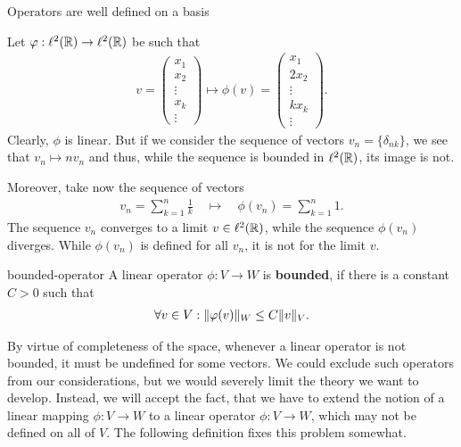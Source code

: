 \begin{todo}
  Operators are well defined on a basis
\end{todo}

\begin{example}
  Let $\varphi:\ell^2(\mathbb R)\to\ell^2(\mathbb R)$ be such that
  \begin{gather*}
    v =
    \begin{pmatrix}
      x_1 \\ x_2 \\ \vdots \\ x_k \\ \vdots
    \end{pmatrix}
    \mapsto \phi(v) =
    \begin{pmatrix}
      x_1 \\ 2x_2 \\ \vdots \\ kx_k \\ \vdots
    \end{pmatrix}.
  \end{gather*}
  Clearly, $\phi$ is linear. But if we consider the sequence of
  vectors $v_n = \{\delta_{nk}\}$, we see that $v_n \mapsto n v_n$ and
  thus, while the sequence is bounded in $\ell^2(\mathbb R)$, its image is
  not.
  
  Moreover, take now the sequence of vectors
  \begin{gather*}
    v_n = \sum_{k=1}^n \frac1k
    \quad \mapsto \quad \phi(v_n) = \sum_{k=1}^n 1.
  \end{gather*}
  The sequence $v_n$ converges to a limit $v \in \ell^2(\mathbb R)$, while
  the sequence $\phi(v_n)$ diverges. While $\phi(v_n)$ is defined for
  all $v_n$, it is not for the limit $v$.
\end{example}

\begin{Definition}{bounded-operator}
  A linear operator $\phi: V\to W$ is \textbf{bounded}, if there is a constant
  $C > 0$ such that
  \begin{gather*}
    \forall v\in V: \lVert\varphi(v)\rVert_W \le C \lVert v\vphantom{()}\rVert_V.
  \end{gather*}
\end{Definition}

\begin{remark}
  By virtue of completeness of the space, whenever a linear operator
  is not bounded, it must be undefined for some vectors. We could
  exclude such operators from our considerations, but we would
  severely limit the theory we want to develop. Instead, we will
  accept the fact, that we have to extend the notion of a linear
  mapping $\phi: V\to W$ to a linear operator $\phi: V\to W$, which
  may not be defined on all of $V$. The following definition fixes
  this problem somewhat.
\end{remark}


